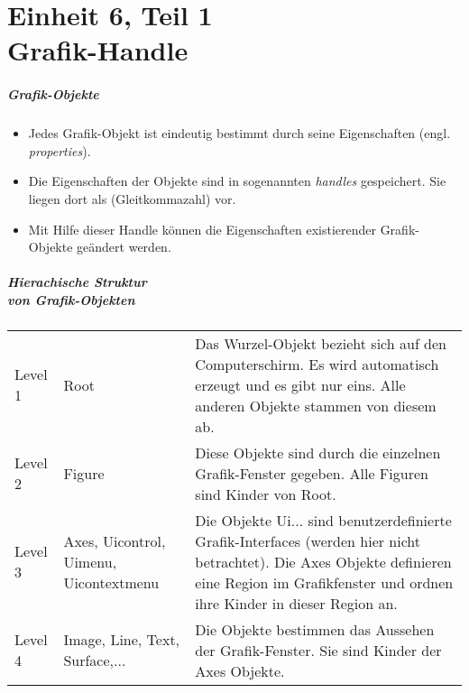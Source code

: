 %
\subtitle{Einheit 6 \\ Grafik Handle \\ GUI -- Programmierung}
\maketitle
\part{Einheit 6, Teil 1 \\ Grafik-Handle}
\begin{frame}[fragile]\frametitle{Grafik-Objekte}
\begin{itemize}
\item Jedes Grafik-Objekt ist eindeutig bestimmt durch seine Eigenschaften
(engl. {\it properties}). 
\item Die Eigenschaften  der Objekte sind  in  sogenannten
{\it handles} gespeichert. Sie liegen dort als 
(Gleitkommazahl) vor.  
\item Mit Hilfe dieser Handle k\"onnen die Eigenschaften 
existierender Grafik-Objekte ge\"andert werden.    
\end{itemize}
\end{frame}
%
%
\begin{frame}[fragile]\frametitle{Hierachische Struktur\\ von Grafik-Objekten}
\vspace*{0.5cm}
{\tiny
\begin{tabular}{lp{3cm}p{6cm}}

Level 1 & Root & Das Wurzel-Objekt  bezieht sich auf den
Computerschirm. Es wird automatisch erzeugt und es gibt nur eins. Alle
anderen Objekte stammen von diesem ab.\\

Level 2 & Figure & Diese Objekte sind durch die einzelnen
Grafik-Fenster gegeben. Alle Figuren sind Kinder von Root. \\

Level 3 & Axes, Uicontrol, Uimenu, Uicontextmenu & Die Objekte
Ui... sind benutzerdefinierte Grafik-Interfaces (werden hier nicht
betrachtet).\linebreak
 Die Axes Objekte
definieren eine Region im Grafikfenster und ordnen ihre Kinder in
dieser Region an.\\

Level 4 & Image, Line, Text, Surface,... & Die Objekte bestimmen das
Aussehen der Grafik-Fenster. Sie sind Kinder der Axes Objekte.\\ 
\end{tabular}
}
\end{frame}
